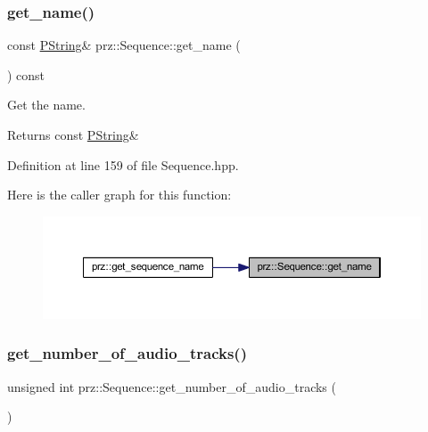 \subsubsection{\texorpdfstring{get\_name()}{get\_name()}}
{\footnotesize\ttfamily const \mbox{\hyperlink{classprz_1_1_p_string}{P\+String}}\& prz\+::\+Sequence\+::get\+\_\+name (\begin{DoxyParamCaption}{ }\end{DoxyParamCaption}) const\hspace{0.3cm}{\ttfamily [inline]}}



Get the name. 

\begin{DoxyReturn}{Returns}
const \mbox{\hyperlink{classprz_1_1_p_string}{P\+String}}\& 
\end{DoxyReturn}


Definition at line 159 of file Sequence.\+hpp.

Here is the caller graph for this function\+:
\nopagebreak
\begin{figure}[H]
\begin{center}
\leavevmode
\includegraphics[width=350pt]{classprz_1_1_sequence_a3482d0948898b7573df2e0f86d7e3a83_icgraph}
\end{center}
\end{figure}
\mbox{\label{classprz_1_1_sequence_a2d0ac9ea8804465100b36bb36a687799}} 
\subsubsection{\texorpdfstring{get\_number\_of\_audio\_tracks()}{get\_number\_of\_audio\_tracks()}}
{\footnotesize\ttfamily unsigned int prz\+::\+Sequence\+::get\+\_\+number\+\_\+of\+\_\+audio\+\_\+tracks (\begin{DoxyParamCaption}{ }\end{DoxyParamCaption})}



